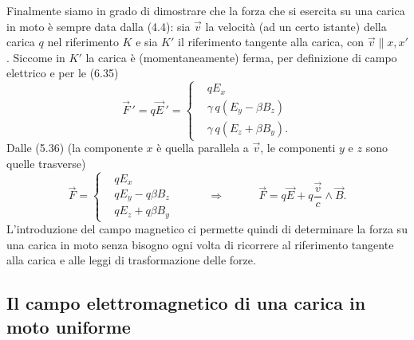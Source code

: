Finalmente siamo in grado di dimostrare che la forza che si esercita su una
carica in moto \`e sempre data dalla (4.4): sia $\vec v$ la velocit\`a (ad un
certo istante) della carica $q$ nel riferimento $K$ e sia $K'$ il riferimento
tangente alla carica, con $\vec v\parallel x,x'$. Siccome in $K'$ la carica \`e
(momentaneamente) ferma, per definizione di campo elettrico e per le (6.35)
\begin{equation}
  \vec F\,'=q\vec E\,'=\left\{\begin{aligned}
    &qE_x\\
    &\gamma\,q(E_y-\beta B_z)\\
    &\gamma\,q(E_z+\beta B_y).
  \end{aligned}\right.
  \tag{6.39}
\end{equation}
Dalle (5.36) (la componente $x$ \`e quella parallela a $\vec v$, le componenti
$y$ e $z$ sono quelle trasverse)
\begin{equation}
  \vec F=\left\{\begin{aligned}
    &qE_x\\
    &qE_y-q\beta B_z\\
    &qE_z+q\beta B_y
  \end{aligned}\right.
  \qquad\quad\Rightarrow\qquad\quad\vec F=q\vec E+q\frac{\vec v}{c}\wedge\vec B.
  \tag{6.40}
\end{equation}
L'introduzione del campo magnetico ci permette quindi di determinare la forza su
una carica in moto senza bisogno ogni volta di ricorrere al riferimento tangente
alla carica e alle leggi di trasformazione delle forze.

\subsection{Il campo elettromagnetico di una carica in moto uniforme}

